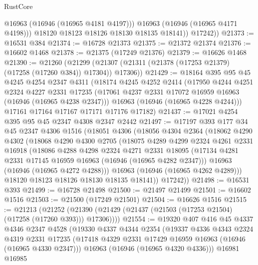 \begin{lexlean}{RustCore}
\begin{coremodule}
                @16963
                (@16946 (@16965 @4181 @4197)))
              @16963
              (@16946 (@16965 @4171 @4198)))
            @18120
            @18123
            @18126
            @18130
            @18135
            @18141))
        @17242))
@21373 := @16531 @384
@21374 := @16728 @21373
@21375 := @21372 @21374
@21376 := @16602 @1468
@21378 := @21375 (@17249 @21376)
@21379 := @16626 @1468
@21390 := @21260
    (@21299 (@21307 (@21311 (@21378 (@17253 @21379) (@17258 (@17260 @384)) @17304)) @17306))
@21429 := @18164
    @395
    @95
    @45
    @4245
    @4254
    @2347
    @4311
    (@18174
      @4245
      @4252
      @2414
      (@17950
        @4244
        @4251
        @2324
        @4227
        @2331
        @17235
        (@17061 @4237 @2331 @17072 @16959 @16963 (@16946 (@16965 @4238 @2347)))
        @16963
        (@16946 (@16965 @4228 @4244)))
      @17161
      @17164
      @17167
      @17171
      @17176
      @17182)
@21437 := @17021 @4254 @395 @95 @45 @2347 @4308 @2347 @2442
@21497 := @17197
    @393
    @177
    @34
    @45
    @2347
    @4306
    @1516
    (@18051
      @4306
      (@18056
        @4304
        @2364
        (@18062
          @4290
          @4302
          (@18068
            @4290
            @4300
            @2705
            (@18075
              @4289
              @4299
              @2324
              @4261
              @2331
              @16918
              (@18086
                @4288
                @4298
                @2324
                @4271
                @2331
                @18095
                (@17134 @4281 @2331 @17145 @16959 @16963 (@16946 (@16965 @4282 @2347)))
                @16963
                (@16946 (@16965 @4272 @4288)))
              @16963
              (@16946 (@16965 @4262 @4289)))
            @18120
            @18123
            @18126
            @18130
            @18135
            @18141))
        @17242))
@21498 := @16531 @393
@21499 := @16728 @21498
@21500 := @21497 @21499
@21501 := @16602 @1516
@21503 := @21500 (@17249 @21501)
@21504 := @16626 @1516
@21515 := @21213
    (@21252 (@21390 (@21429 (@21437 (@21503 (@17253 @21504) (@17258 (@17260 @393))) @17306))))
@21554 := @19320
    @407
    @416
    @45
    @4337
    @4346
    @2347
    @4528
    (@19330
      @4337
      @4344
      @2354
      (@19337
        @4336
        @4343
        @2324
        @4319
        @2331
        @17235
        (@17418 @4329 @2331 @17429 @16959 @16963 (@16946 (@16965 @4330 @2347)))
        @16963
        (@16946 (@16965 @4320 @4336)))
      @16981
      @16985

\end{coremodule}
\end{lexlean}
